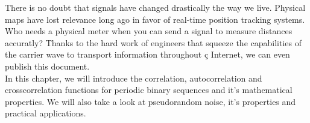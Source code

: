 There is no doubt that signals have changed drastically the way we live.
Physical maps have lost relevance long ago in favor of real-time position
tracking systems. Who needs a physical meter when you can send a signal to
measure distances accuratly?  Thanks to the hard work of engineers that squeeze
the capabilities of the carrier wave to transport information throughout ç
Internet, we can even publish this document.\\

In this chapter, we will introduce the correlation, autocorrelation and
crosscorrelation functions for periodic binary sequences and it's mathematical
properties. We will also take a look at pseudorandom noise, it's properties and
practical applications.

 
